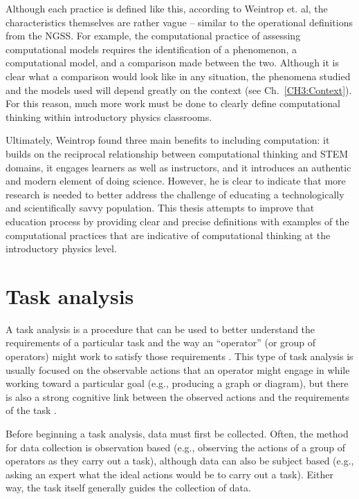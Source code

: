 \documentclass{msuphddissertation}
\begin{document}
\begin{doublespace}
Although each practice is defined like this, according to Weintrop et. al, the characteristics themselves are rather vague -- similar to the operational definitions from the NGSS.  For example, the computational practice of assessing computational models requires the identification of a phenomenon, a computational model, and a comparison made between the two.  Although it is clear what a comparison would look like in any situation, the phenomena studied and the models used will depend greatly on the context (see Ch.~\ref{CH3:Context}).  For this reason, much more work must be done to clearly define computational thinking within introductory physics classrooms.

Ultimately, Weintrop found three main benefits to including computation: it builds on the reciprocal relationship between computational thinking and STEM domains, it engages learners as well as instructors, and it introduces an authentic and modern element of doing science.  However, he is clear to indicate that more research is needed to better address the challenge of educating a technologically and scientifically savvy population.  This thesis attempts to improve that education process by providing clear and precise definitions with examples of the computational practices that are indicative of computational thinking at the introductory physics level.

\section{Task analysis}\label{CH2:TaskAnalysis}

A task analysis is a procedure that can be used to better understand the requirements of a particular task and the way an ``operator'' (or group of operators) might work to satisfy those requirements \cite{Kirwan2005}.  This type of task analysis is usually focused on the observable actions that an operator might engage in while working toward a particular goal (e.g., producing a graph or diagram), but there is also a strong cognitive link between the observed actions and the requirements of the task \cite{Crandall2006}.

Before beginning a task analysis, data must first be collected.  Often, the method for data collection is observation based (e.g., observing the actions of a group of operators as they carry out a task), although data can also be subject based (e.g., asking an expert what the ideal actions would be to carry out a task).  Either way, the task itself generally guides the collection of data.


\end{doublespace}
\end{document}
